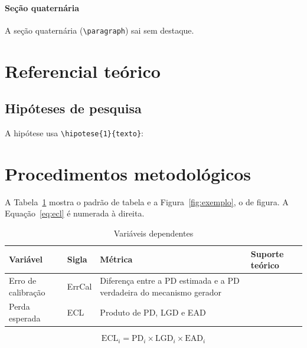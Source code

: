 \documentclass[12pt,a4paper]{article}
\begin{document}
\paragraph{Seção quaternária}

A seção quaternária (\verb|\paragraph|) sai sem destaque.

\section{Referencial teórico}

\subsection{Hipóteses de pesquisa}

A hipótese usa \verb|\hipotese{1}{texto}|:


\section{Procedimentos metodológicos}

A Tabela~\ref{tab:exemplo} mostra o padrão de tabela e a
Figura~\ref{fig:exemplo}, o de figura. A Equação~\ref{eq:ecl} é numerada à
direita.

\begin{table}[htbp]
  \caption{Variáveis dependentes}
  \label{tab:exemplo}
  \begin{tabularx}{\textwidth}{l l X l}
    \toprule
    \textbf{Variável} & \textbf{Sigla} & \textbf{Métrica} & \textbf{Suporte teórico} \\
    \midrule
    Erro de calibração & ErrCal & Diferença entre a PD estimada e a PD
      verdadeira do mecanismo gerador & \textcite{dickinson2011} \\
    Perda esperada & ECL & Produto de PD, LGD e EAD & \textcite{jensen1976} \\
    \bottomrule
  \end{tabularx}
\end{table}

\begin{equation}
  \mathrm{ECL}_i = \mathrm{PD}_i \times \mathrm{LGD}_i \times \mathrm{EAD}_i
  \label{eq:ecl}
\end{equation}
\end{document}
